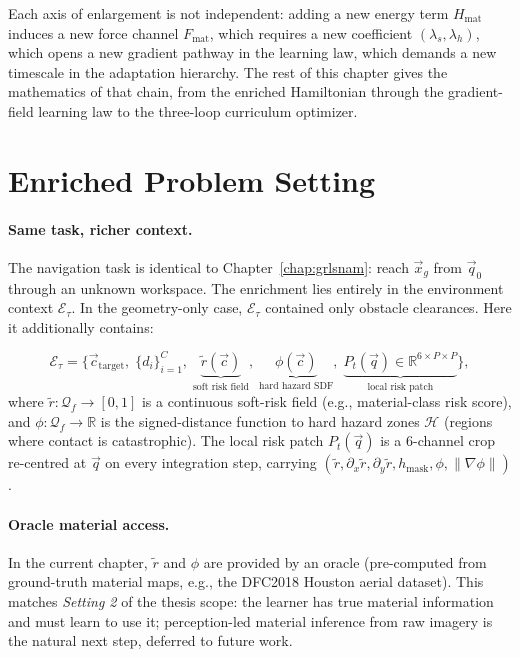 Each axis of enlargement is not independent: adding a new energy term
$H_{\mathrm{mat}}$ induces a new force channel $F_{\mathrm{mat}}$, which
requires a new coefficient $(\lambda_s, \lambda_h)$, which opens a new
gradient pathway in the learning law, which demands a new timescale in
the adaptation hierarchy.
The rest of this chapter gives the mathematics of that chain, from the
enriched Hamiltonian through the gradient-field learning law to the
three-loop curriculum optimizer.

\section{Enriched Problem Setting}
\label{sec:ch4:setting}

\paragraph{Same task, richer context.}
The navigation task is identical to Chapter~\ref{chap:grlsnam}:
reach $\vec{x}_g$ from $\vec{q}_0$ through an unknown workspace.
The enrichment lies entirely in the environment context
$\mathcal{E}_\tau$.
In the geometry-only case, $\mathcal{E}_\tau$ contained only obstacle
clearances.
Here it additionally contains:

\begin{equation}
  \mathcal{E}_\tau
  = \bigl\{
      \vec{c}_{\mathrm{target}},\;
      \{d_i\}_{i=1}^{C},\;
      \underbrace{\tilde{r}(\vec{c})}_{\text{soft risk field}},\;
      \underbrace{\phi(\vec{c})}_{\text{hard hazard SDF}},\;
      \underbrace{P_t(\vec{q}) \in \mathbb{R}^{6\times P\times P}}_{\text{local risk patch}}
    \bigr\},
  \label{eq:ch4:context}
\end{equation}
where $\tilde{r} : \mathcal{Q}_f \to [0,1]$ is a continuous soft-risk
field (e.g., material-class risk score), and
$\phi : \mathcal{Q}_f \to \mathbb{R}$ is the signed-distance function
to hard hazard zones $\mathcal{H}$ (regions where contact is catastrophic).
The local risk patch $P_t(\vec{q})$ is a $6$-channel crop
re-centred at $\vec{q}$ on every integration step, carrying
$(\tilde{r}, \partial_x\tilde{r}, \partial_y\tilde{r},
   h_{\mathrm{mask}}, \phi, \|\nabla\phi\|)$.

\paragraph{Oracle material access.}
In the current chapter, $\tilde{r}$ and $\phi$ are provided by an oracle
(pre-computed from ground-truth material maps, e.g., the DFC2018 Houston
aerial dataset).
This matches \emph{Setting 2} of the thesis scope: the learner has true
material information and must learn to use it; perception-led material
inference from raw imagery is the natural next step, deferred to future
work.

